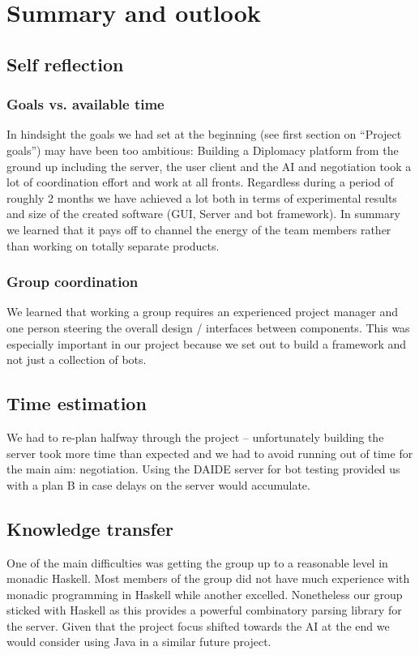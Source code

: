 \documentclass[pdftex,11pt,a4paper]{report}
\begin{document}

\pagebreak

\chapter{Summary and outlook}

\section{Self reflection}

\subsection{Goals vs. available time}
In hindsight the goals we had set at the beginning (see first section
on ``Project goals'') may have been too ambitious: Building a
Diplomacy platform from the ground up including the server, the user
client and the AI and negotiation took a lot of coordination effort
and work at all fronts. Regardless during a period of roughly 2 months
we have achieved a lot both in terms of experimental results and size
of the created software (GUI, Server and bot framework). In summary we 
learned that it pays off to channel the energy of the team members 
rather than working on totally separate products.

\subsection{Group coordination} 
We learned that working a group requires an experienced project
manager and one person steering the overall design / interfaces
between components. This was especially important in our project 
because we set out to build a framework and not just a collection
of bots.

\section{Time estimation}
We had to re-plan halfway through the project -- unfortunately
building the server took more time than expected and
we had to avoid running out of time for the main aim: 
negotiation. Using the DAIDE server for bot testing provided
us with a plan B in case delays on the server would accumulate.

\section{Knowledge transfer}
One of the main difficulties was getting the group up to a reasonable
level in monadic Haskell. Most members of the group did not have much
experience with monadic programming in Haskell while another excelled.
Nonetheless our group sticked with Haskell as this provides a 
powerful combinatory parsing library \cite{ParsecLib} for the server.
Given that the project focus shifted towards the AI at the end we 
would consider using Java in a similar future project. \\
\end{document}
